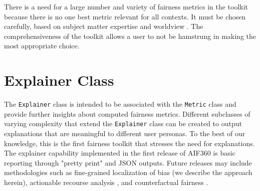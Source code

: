 \documentclass{article}
\begin{document}
There is a  need for a large number and variety of fairness metrics in the toolkit because there is no one best metric relevant for all contexts. It must be chosen carefully, based on subject matter expertise and worldview \citep{FriedlerSV2016}. The comprehensiveness of the toolkit allows a user to not be hamstrung in making the most appropriate choice. 

\section{Explainer Class}
\label{sec:explainerclass}


%
The \texttt{Explainer} class is intended to be associated with the \texttt{Metric} class and provide further insights about computed fairness metrics.  Different subclasses of varying complexity that extend the \texttt{Explainer} class can be created to output explanations that are meaningful to different user personas.  To the best of our knowledge, this is the first fairness toolkit that stresses the need for explanations.  The explainer capability implemented in the first release of AIF360 is basic reporting through "pretty print" and JSON outputs.  Future releases may include methodologies such as fine-grained localization of bias (we describe the approach herein), actionable recourse analysis \cite{UstunSL2018}, and counterfactual fairness \cite{WachterMR2018}. 


\end{document}
